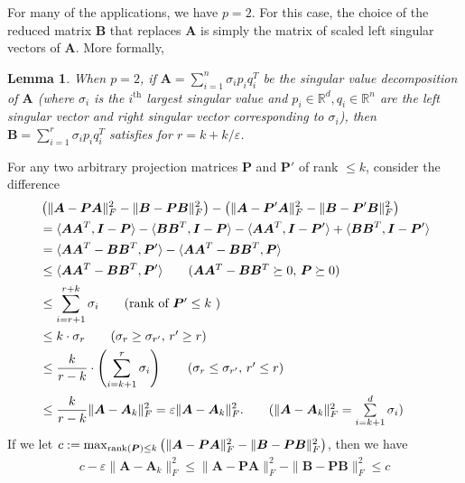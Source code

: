 \documentclass[11pt]{article}
\makeatletter
\newcommand{\sumL}{\sum\limits}
\theoremstyle{plain}
\newtheorem{lemma}[theorem]{Lemma}
\theoremstyle{plain}
\theoremstyle{definition}
\theoremstyle{plain}
\theoremstyle{remark}
\newenvironment{proof}[1][\protect\proofname]{\par
	\normalfont\topsep6\p@\@plus6\p@\relax
	\trivlist
	\itemindent\parindent
	\item[\hskip\labelsep\scshape #1]\ignorespaces
}{\endtrivlist\@endpefalse
}
\providecommand{\proofname}{Proof}
\newcommand{\RR}{\mathbb{R}}
\makeatother
\begin{document}
For many of the applications, we have $p=2$. For this case, the choice of the reduced matrix $\bm{B}$ that replaces $\bm{A}$ is simply the matrix of scaled left singular vectors of $\bm{A}$. More formally, 
\begin{lemma}
\label{lem:coreset_p=2}
When $p=2$, if $\bm{A}=\sumL_{i=1}^n \sigma_i p_iq_i^T$ be the singular value decomposition of $\bm{A}$ (where $\sigma_i$ is the $i^{\text{th}}$ largest singular value and $p_i\in \RR^d,q_i\in \RR^n$ are the left singular vector and right singular vector corresponding to $\sigma_i$), then $\bm{B}=\sumL_{i=1}^{r} \sigma_i p_iq_i^T$ satisfies  for $r=k+k/\varepsilon$.
\end{lemma}
\begin{proof}
For any two arbitrary projection matrices $\bm{P}$ and $\bm{P}'$ of rank $\leq k$, consider the difference 
\begin{align}
&   \left( \|\bm{A}-\bm{P}\bm{A}\|_F^2-\|\bm{B}-\bm{P}\bm{B}\|_F^2\right)-\left(\|\bm{A}-\bm{P}'\bm{A}\|_F^2-\|\bm{B}-\bm{P}'\bm{B}\|_F^2\right) \\
& =\langle\bm{A}\bm{A}^T, \bm{I}-\bm{P}\rangle-\langle\bm{B}\bm{B}^T, \bm{I}-\bm{P}\rangle-\langle\bm{A}\bm{A}^T, \bm{I}-\bm{P}'\rangle+\langle\bm{B}\bm{B}^T, \bm{I}-\bm{P}'\rangle \\
& = \langle\bm{A}\bm{A}^T-\bm{B}\bm{B}^T, \bm{P}'\rangle -\langle\bm{A}\bm{A}^T-\bm{B}\bm{B}^T, \bm{P}\rangle \\
& \leq \langle\bm{A}\bm{A}^T-\bm{B}\bm{B}^T, \bm{P}'\rangle \tag{$\bm{A}\bm{A}^T-\bm{B}\bm{B}^T\succeq 0,\, \bm{P}\succeq 0$}\\
&\leq \sumL_{i=r+1}^{r+k} \sigma_i \tag{rank of $\bm{P}' \leq k$ }\\
            & \leq k\cdot \sigma_r \tag{$\sigma_r\geq \sigma_{r'},\, r'\geq r$}\\
            &\leq \frac{k}{r-k}\cdot \left(\sumL_{i=k+1}^r \sigma_i\right) \tag{$\sigma_r \leq \sigma_{r'},\, r'\leq r$}\\
            &\leq \frac{k}{r-k}\|\bm{A}-\bm{A}_k\|_F^2 =\varepsilon \|\bm{A}-\bm{A}_k\|_F^2. \tag{$\|\bm{A}-\bm{A}_k\|_F^2 =\sumL_{i=k+1}^d \sigma_i$}
\end{align}
If we let $c:=\max_{\textnormal{rank}(\bm{P})\leq k}\left( \|\bm{A}-\bm{P}\bm{A}\|_F^2-\|\bm{B}-\bm{P}\bm{B}\|_F^2\right)$, then we have  
\begin{align*}
     c-\varepsilon\|\bm{A}-\bm{A}_k\|_F^2 \leq \|\bm{A}-\bm{P}\bm{A}\|_F^2-\|\bm{B}-\bm{P}\bm{B}\|_F^2 \leq c
\end{align*}

\end{proof}
\end{document}
